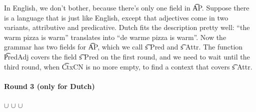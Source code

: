 In English, we don’t bother, because there’s only one field in
\t{AP}. Suppose there is a language that is just like English, except
that adjectives come in two variants, attributive and
predicative. Dutch fits the description pretty well: ``the warm pizza
is warm'' translates into ``de warme pizza is warm''. Now the grammar has two fields for
\t{AP}, which we call \t{s Pred} and \t{s Attr}. The function \t{PredAdj} covers the
field \t{s Pred} on the first round, and we need to wait until the third round, when \t{CtxCN} is
no more empty, to find a context that covers \t{s Attr}. 

\paragraph{Round 3 (only for Dutch)}

\begin{EmptyItem}
\begin{HighlightingFancy}[]
    \OtherTok{::=} 
  \OtherTok{::=}   \NormalTok{\}} $\cup$
              \NormalTok{\}}
   \OtherTok{::=}   \NormalTok{\}} $\cup$
              \NormalTok{\}}
  \OtherTok{::=}   \NormalTok{\}}
   \OtherTok{::=}   \NormalTok{\}} $\cup$
              \NormalTok{\}}
 \OtherTok{::=}   \NormalTok{\}}
 \OtherTok{::=}   \NormalTok{\}}
 \OtherTok{::=}   \NormalTok{\}}
\end{HighlightingFancy}
\end{EmptyItem}

